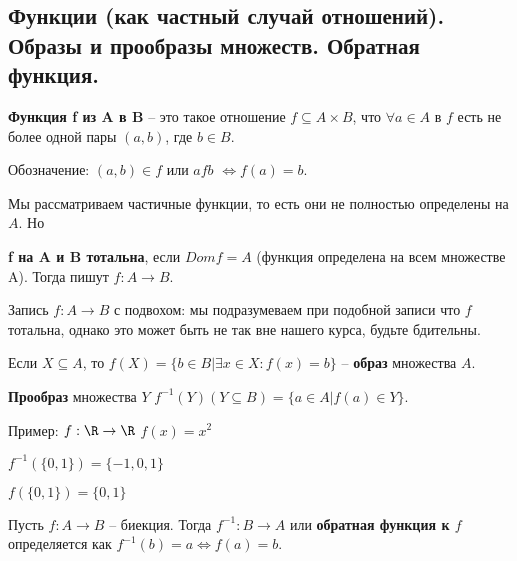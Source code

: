 \subsection{Функции (как частный случай отношений). Образы и прообразы множеств. Обратная функция.}

\textbf{Функция f из A в B} -- это такое отношение $f \subseteq A \times B$, что $\forall a \in A$ в $f$ есть не более одной пары $(a, b)$, где $b \in B$.

Обозначение: $(a, b) \in f$ или $afb$ $\Leftrightarrow f(a) = b$.

 Мы рассматриваем частичные функции, то есть они не полностью определены на $A$. Но

   \textbf{f на A и B тотальна}, если $Dom f = A$ (функция определена на всем множестве A). Тогда пишут $f: A \rightarrow B$.

   Запись $f: A \rightarrow B$ с подвохом: мы подразумеваем при подобной записи что $f$ тотальна, однако это может быть не так вне нашего курса, будьте бдительны.

   Если $X \subseteq A$, то $f(X) = \{b \in B| \exists x \in X: f(x) = b\}$ -- \textbf{образ} множества $A$.

   \textbf{Прообраз} множества $Y$ $f^{-1}(Y) (Y \subseteq B) = \{a \in A| f(a) \in Y\}$.

   Пример: $f: \R \rightarrow \R$ $f(x) = x^2$

   $f^{-1}(\{0, 1\}) = \{-1, 0, 1\}$

   $f(\{0, 1\}) = \{0, 1\}$

   Пусть $f: A \rightarrow B$ -- биекция. Тогда $f^{-1}: B \rightarrow A$ или \textbf{обратная функция к $f$} определяется как $f^{-1}(b) = a \Leftrightarrow f(a) = b$.
